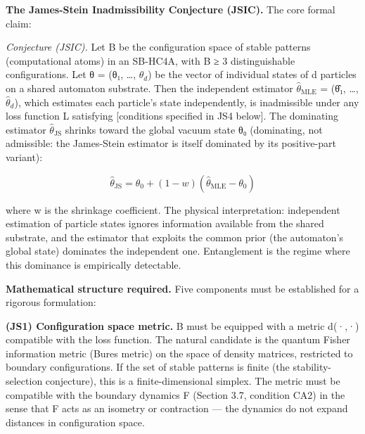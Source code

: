 \documentclass[
]{article}
\begin{document}
\textbf{The James-Stein Inadmissibility Conjecture (JSIC).} The core
formal claim:

\emph{Conjecture (JSIC).} Let B be the configuration space of stable
patterns (computational atoms) in an SB-HC4A, with \textbar B\textbar{}
≥ 3 distinguishable configurations. Let θ = (θ₁, \ldots, \(\theta_{d}\))
be the vector of individual states of d particles on a shared automaton
substrate. Then the independent estimator
\(\hat{\theta}_{\mathrm{MLE}}\) = (θ̂₁, \ldots, \(\hat{\theta}_{d}\)),
which estimates each particle's state independently, is inadmissible
under any loss function L satisfying {[}conditions specified in JS4
below{]}. The dominating estimator \(\hat{\theta}_{\mathrm{JS}}\)
shrinks toward the global vacuum state θ₀ (dominating, not admissible:
the James-Stein estimator is itself dominated by its positive-part
variant):

\[\hat{\theta}_{\mathrm{JS}} = \theta_0 + (1 - w)(\hat{\theta}_{\mathrm{MLE}} - \theta_0)\]

where w is the shrinkage coefficient. The physical interpretation:
independent estimation of particle states ignores information available
from the shared substrate, and the estimator that exploits the common
prior (the automaton's global state) dominates the independent one.
Entanglement is the regime where this dominance is empirically
detectable.

\textbf{Mathematical structure required.} Five components must be
established for a rigorous formulation:

\textbf{(JS1) Configuration space metric.} B must be equipped with a
metric d(·,·) compatible with the loss function. The natural candidate
is the quantum Fisher information metric (Bures metric) on the space of
density matrices, restricted to boundary configurations. If the set of
stable patterns is finite (the stability-selection conjecture), this is
a finite-dimensional simplex. The metric must be compatible with the
boundary dynamics F (Section 3.7, condition CA2) in the sense that F
acts as an isometry or contraction --- the dynamics do not expand
distances in configuration space.
\end{document}
